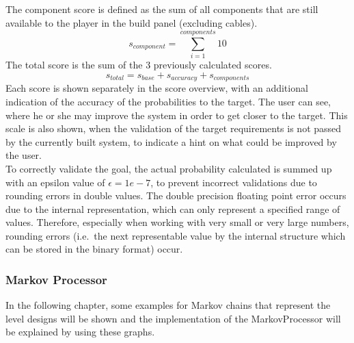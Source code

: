 The component score is defined as the sum of all components that are still available to the player in the build panel (excluding cables).
\begin{equation}
    s_{component} = \sum_{i = 1}^{components} 10
    \label{eq:component-score}
\end{equation}
The total score is the sum of the 3 previously calculated scores.
\begin{equation}
    s_{total} = s_{base} + s_{accuracy} + s_{components}
    \label{eq:total-score}
\end{equation}
Each score is shown separately in the score overview, with an additional indication of the accuracy of the probabilities to the target.
The user can see, where he or she may improve the system in order to get closer to the target.
This scale is also shown, when the validation of the target requirements is not passed by the currently built system, to indicate
a hint on what could be improved by the user.
\\
To correctly validate the goal, the actual probability calculated is summed up with an epsilon value of $\epsilon = 1e-7$,
to prevent incorrect validations due to rounding errors in double values.
The double precision floating point error occurs due to the internal representation, which can only represent a specified range of
values.
Therefore, especially when working with very small or very large numbers, rounding errors (i.e.\ the next representable value by the internal structure which can be stored
in the binary format) occur.
\subsubsection{Markov Processor}\label{subsubsec:example-markov-chains}
In the following chapter, some examples for Markov chains that represent the level designs will be shown and the implementation of the
MarkovProcessor will be explained by using these graphs.

\\ \\

